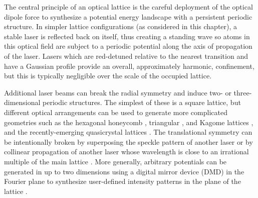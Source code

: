 	The central principle of an optical lattice is the careful deployment of the optical dipole force \cite{Grimm00} to synthesize a potential energy landscape with a persistent periodic structure.
	In simpler lattice configurations (as considered in this chapter), a stable laser is reflected back on itself, thus creating a standing wave so atoms in this optical field are subject to a periodic potential along the axis of propagation of the laser.
	Lasers which are red-detuned relative to the nearest transition and have a Gaussian profile provide an overall, approximately harmonic, confinement, but this is typically negligible over the scale of the occupied lattice.
	
	Additional laser beams can break the radial symmetry and induce two- or three-dimensional periodic structures.
	The simplest of these is a square lattice, but different optical arrangements can be used to generate more complicated geometries such as the hexagonal honeycomb \cite{Jotzu14},  triangular \cite{Becker10}, and Kagome lattices \cite{Jo12}, and the recently-emerging quasicrystal lattices \cite{Viebahn19}.
	The translational symmetry can be intentionally broken by superposing the speckle pattern of another laser \cite{Pasienski10} or by collinear propagation of another laser whose wavelength is close to an irrational multiple of the main lattice \cite{Rispoli19}.
	More generally, arbitrary potentials can be generated in up to two dimensions using a digital mirror device (DMD) in the Fourier plane to synthesize user-defined intensity patterns in the plane of the lattice \cite{Gross17}.
	

